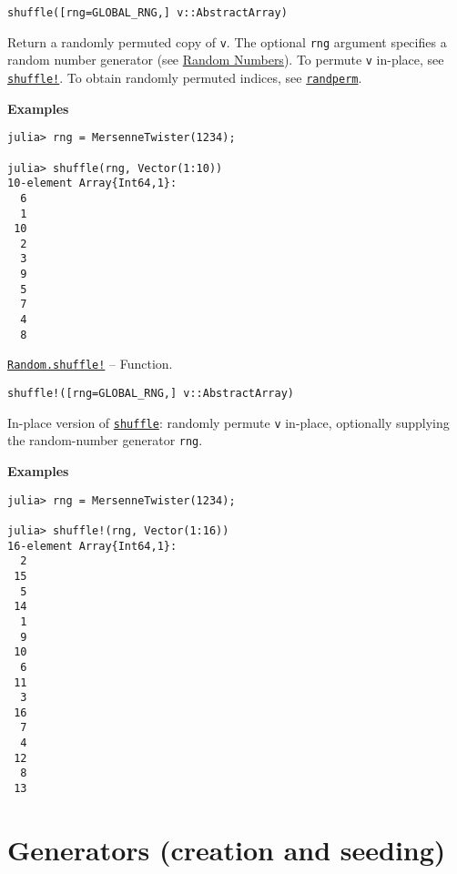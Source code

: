 \begin{adjustwidth}{2em}{0pt}


\begin{verbatim}
shuffle([rng=GLOBAL_RNG,] v::AbstractArray)
\end{verbatim}

Return a randomly permuted copy of \texttt{v}. The optional \texttt{rng} argument specifies a random number generator (see \href{@ref}{Random Numbers}). To permute \texttt{v} in-place, see \hyperlink{15315300334019616632}{\texttt{shuffle!}}. To obtain randomly permuted indices, see \hyperlink{7342203624124611352}{\texttt{randperm}}.

\textbf{Examples}


\begin{verbatim}
julia> rng = MersenneTwister(1234);

julia> shuffle(rng, Vector(1:10))
10-element Array{Int64,1}:
  6
  1
 10
  2
  3
  9
  5
  7
  4
  8
\end{verbatim}



\end{adjustwidth}
\hypertarget{15315300334019616632}{} 
\hyperlink{15315300334019616632}{\texttt{Random.shuffle!}}  -- {Function.}

\begin{adjustwidth}{2em}{0pt}


\begin{verbatim}
shuffle!([rng=GLOBAL_RNG,] v::AbstractArray)
\end{verbatim}

In-place version of \hyperlink{16742615893822221762}{\texttt{shuffle}}: randomly permute \texttt{v} in-place, optionally supplying the random-number generator \texttt{rng}.

\textbf{Examples}


\begin{verbatim}
julia> rng = MersenneTwister(1234);

julia> shuffle!(rng, Vector(1:16))
16-element Array{Int64,1}:
  2
 15
  5
 14
  1
  9
 10
  6
 11
  3
 16
  7
  4
 12
  8
 13
\end{verbatim}



\end{adjustwidth}

\hypertarget{16600936393177391619}{}


\section{Generators (creation and seeding)}


